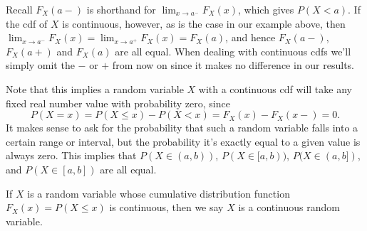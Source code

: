 \par
\rmk Recall $F_X(a - )$ is shorthand for $\lim_{x \to a^{-}}F_X(x)$, which gives $P(X < a)$. If the cdf of $X$ is continuous, however, as is the case in our example above, then $\lim_{x \to a^{-}}F_X(x) = \lim_{x \to a^{+}}F_X(x) = F_X(a)$, and hence $F_X(a-)$, $F_X(a+)$ and $F_X(a)$ are all equal. When dealing with continuous cdfs we'll simply omit the $-$ or $+$ from now on since it makes no difference in our results.
\par
Note that this implies a random variable $X$ with a continuous cdf will take any fixed real number value with probability zero, since
$$P(X = x) = P(X \leq x) - P(X < x) = F_X(x) - F_X(x-) = 0.$$
It makes sense to ask for the probability that such a random variable falls into a certain range or interval, but the probability it's exactly equal to a given value is always zero. This implies that $P(X \in (a,b))$, $P(X \in [a,b))$, $P(X \in (a,b])$, and $P(X \in [a,b])$ are all equal.
\par
\begin{defn}If $X$ is a random variable whose cumulative distribution function $F_X(x) = P(X \leq x)$ is continuous, then we say $X$ is a continuous random variable.
\end{defn}
\par
